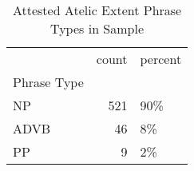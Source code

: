 \begin{table}[htbp!]
\centering
\caption{Attested Atelic Extent Phrase Types in Sample}
\label{table:atel_phtype_ct}
\begin{tabular}{lrl}
\toprule
{} &  count & percent \\
Phrase Type &        &         \\
\midrule
NP          &    521 &     90\% \\
ADVB        &     46 &      8\% \\
PP          &      9 &      2\% \\
\bottomrule
\end{tabular}
\end{table}
